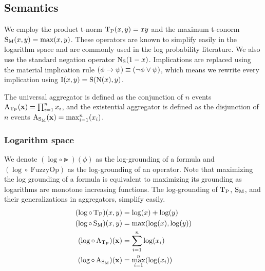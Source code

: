 \documentclass{article}
\theoremstyle{definition}
\begin{document}
\subsection{Semantics}
\label{s:logltn_semantics}
We employ the product t-norm $\operatorname{T_{P}}(x,y) = xy$ and the maximum t-conorm $\operatorname{S_{M}}(x,y) = \max(x,y)$.
These operators are known to simplify easily in the logarithm space and are commonly used in the log probability literature.
We also use the standard negation operator $\operatorname{N_{S}}(1-x)$.
Implications are replaced using the material implication rule $(\phi \rightarrow \psi) \equiv (\lnot\phi \lor \psi)$,
 which means we rewrite every implication using $\operatorname{I}(x,y) = \operatorname{S}(\operatorname{N}(x), y)$.

The universal aggregator is defined as the conjunction of $n$ events $\operatorname{A_{\operatorname{T_{P}}}}(\mathbf{x}) = \prod_{i=1}^{n} x_i$,
 and the existential aggregator is defined as the disjunction of $n$ events $\operatorname{A_{\operatorname{S_{M}}}}(\mathbf{x}) = \max_{i=1}^n (x_i)$.

\subsubsection{Logarithm space}
We denote $(\log\circ\Gt)(\phi)$ as the log-grounding of a formula and $(\log \circ\ \mathrm{FuzzyOp})$ as the log-grounding of an operator.
Note that maximizing the log grounding of a formula is equivalent to maximizing its grounding as logarithms are monotone increasing functions.%
The log-grounding of $\operatorname{T_{P}}$, $\operatorname{S_{M}}$, and their generalizations in aggregators, simplify easily.
\begin{align}
\label{eq:log_semantics_conj}    (\log\circ \operatorname{T_{P}}) (x,y) & = \log(x) + \log(y) \\
\label{eq:log_semantics_disj}    (\log\circ \operatorname{S_{M}}) (x,y) & = \max(\log(x),\log(y))\\
\label{eq:log_semantics_forall} (\log \circ \operatorname{A_{\operatorname{T_{P}}}})(\mathbf{x}) & = \sum_{i=1}^n \log(x_i)\\
\label{eq:log_semantics_exst}(\log \circ \operatorname{A_{\operatorname{S_{M}}}})(\mathbf{x}) & = \max_{i=1}^n (\log(x_i))
\end{align}

\end{document}

